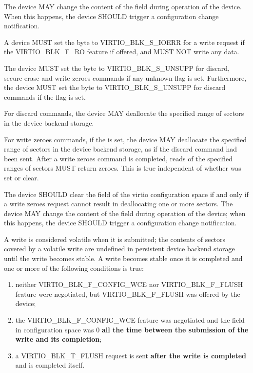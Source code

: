 
The device MAY change the content of the  field during
operation of the device. When this happens, the device SHOULD trigger a
configuration change notification.

A device MUST set the  byte to VIRTIO_BLK_S_IOERR
for a write request if the VIRTIO_BLK_F_RO feature if offered, and MUST NOT
write any data.

The device MUST set the  byte to VIRTIO_BLK_S_UNSUPP for
discard, secure erase and write zeroes commands if any unknown flag is set.
Furthermore, the device MUST set the  byte to
VIRTIO_BLK_S_UNSUPP for discard commands if the  flag is set.

For discard commands, the device MAY deallocate the specified range of
sectors in the device backend storage.

For write zeroes commands, if the  is set, the device MAY
deallocate the specified range of sectors in the device backend storage,
as if the discard command had been sent.  After a write zeroes command
is completed, reads of the specified ranges of sectors MUST return
zeroes.  This is true independent of whether  was set or clear.

The device SHOULD clear the  field of the
virtio configuration space if and only if a write zeroes request cannot
result in deallocating one or more sectors.  The device MAY change the
content of the field during operation of the device; when this happens,
the device SHOULD trigger a configuration change notification.

A write is considered volatile when it is submitted; the contents of
sectors covered by a volatile write are undefined in persistent device
backend storage until the write becomes stable.  A write becomes stable
once it is completed and one or more of the following conditions is true:

\begin{enumerate}
\item\label{item:flush1} neither VIRTIO_BLK_F_CONFIG_WCE nor
  VIRTIO_BLK_F_FLUSH feature were negotiated, but VIRTIO_BLK_F_FLUSH was
  offered by the device;

\item\label{item:flush2} the VIRTIO_BLK_F_CONFIG_WCE feature was negotiated and the
   field in configuration space was 0 \textbf{all the time between
  the submission of the write and its completion};

\item\label{item:flush3} a VIRTIO_BLK_T_FLUSH request is sent \textbf{after the write is
  completed} and is completed itself.
\end{enumerate}

